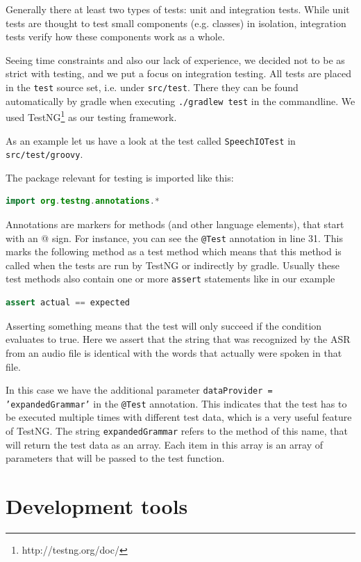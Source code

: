 \documentclass[a4paper, 12pt]{article}
\begin{document}
Generally there at least two types of tests: unit and integration tests.
While unit tests are thought to test small components (e.g. classes) in isolation, integration tests verify how these components work as a whole.

Seeing time constraints and also our lack of experience, we decided not to be as strict with testing, and we put a focus on integration testing.
All tests are placed in the \texttt{test} source set, i.e. under \texttt{src/test}.
There they can be found automatically by gradle when executing \texttt{./gradlew test} in the commandline.
We used TestNG\footnote{http://testng.org/doc/} as our testing framework.

As an example let us have a look at the test called \texttt{SpeechIOTest} in \texttt{src/test/groovy}.

The package relevant for testing is imported like this:
\begin{lstlisting}[language=java]
import org.testng.annotations.*
\end{lstlisting}
Annotations are markers for methods (and other language elements), that start with an @ sign.
For instance, you can see the \texttt{@Test} annotation in line 31.
This marks the following method as a test method which means that this method is called when the tests are run by TestNG or indirectly by gradle.
Usually these test methods also contain one or more \texttt{assert} statements like in our example
\begin{lstlisting}[language=java]
assert actual == expected
\end{lstlisting}
Asserting something means that the test will only succeed if the condition evaluates to true.
Here we assert that the string that was recognized by the ASR from an audio file is identical with the words that actually were spoken in that file.

In this case we have the additional parameter \texttt{dataProvider = 'expandedGrammar'} in the \texttt{@Test} annotation.
This indicates that the test has to be executed multiple times with different test data, which is a very useful feature of TestNG.
The string \texttt{expandedGrammar} refers to the method of this name, that will return the test data as an array.
Each item in this array is an array of parameters that will be passed to the test function.

\newpage
\section{Development tools}
\end{document}
